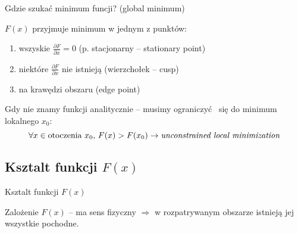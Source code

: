   \begin{frame}{Gdzie szukać minimum funcji? (global minimum)}
    \begin{block}{$ F(x) $ przyjmuje minimum w jednym z punktów:}
      \begin{enumerate}
        \item wszyskie $ \frac{\partial F}{\partial x} = 0 $
        (p. stacjonarny -- stationary point)
        \item niektóre $ \frac{\partial F}{\partial x} $
        nie istnieją (wierzchołek -- cusp)
        \item na krawędzi obszaru (edge point)
      \end{enumerate}
    \end{block}

    Gdy nie znamy funkcji analitycznie -- musimy ograniczyć~
    się do minimum lokalnego $ x_0 $:
    \begin{displaymath}
      \forall x \in \text{otoczenia}\ x_0{,}\ F(x) > F(x_0)
      \to \text{\emph{unconstrained local minimization}}
    \end{displaymath}

  \end{frame}

\subsection{Ksztalt funkcji $ F(x) $}
  \begin{frame}{Ksztalt funkcji $ F(x) $}
    \begin{block}{Zalożenie}
      $ F(x) $ -- ma sens fizyczny $ \Rightarrow $ w rozpatrywanym
      obszarze istnieją jej wszystkie pochodne.
    \end{block}

  \end{frame}
